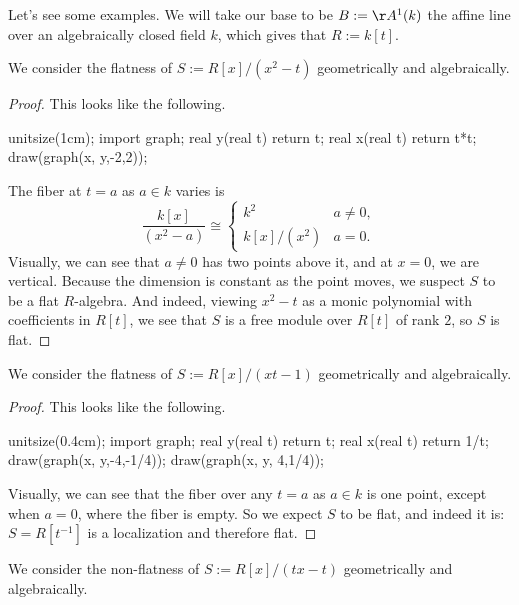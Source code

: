 Let's see some examples. We will take our base to be $B:=\AA^1(k)$ the affine line over an algebraically closed field $k$, which gives that $R:=k[t]$.
\begin{exe}
	We consider the flatness of $S:=R[x]/\left(x^2-t\right)$ geometrically and algebraically.
\end{exe}
\begin{proof}
	This looks like the following.
	\begin{center}
		\begin{asy}
			unitsize(1cm);
			import graph;
			real y(real t)
			{
				return t;
			}
			real x(real t)
			{
				return t*t;
			}
			draw(graph(x, y,-2,2));
		\end{asy}
	\end{center}
	The fiber at $t=a$ as $a\in k$ varies is
	\[\frac{k[x]}{\left(x^2-a\right)}\cong\begin{cases}
		k^2 & a\ne0, \\
		k[x]/\left(x^2\right) & a=0.
	\end{cases}\]
	Visually, we can see that $a\ne0$ has two points above it, and at $x=0$, we are vertical. Because the dimension is constant as the point moves, we suspect $S$ to be a flat $R$-algebra. And indeed, viewing $x^2-t$ as a monic polynomial with coefficients in $R[t]$, we see that $S$ is a free module over $R[t]$ of rank $2$, so $S$ is flat.
\end{proof}
\begin{exe}
	We consider the flatness of $S:=R[x]/\left(xt-1\right)$ geometrically and algebraically.
\end{exe}
\begin{proof}
	This looks like the following.
	\begin{center}
		\begin{asy}
			unitsize(0.4cm);
			import graph;
			real y(real t)
			{
				return t;
			}
			real x(real t)
			{
				return 1/t;
			}
			draw(graph(x, y,-4,-1/4));
			draw(graph(x, y, 4,1/4));
		\end{asy}
	\end{center}
	Visually, we can see that the fiber over any $t=a$ as $a\in k$ is one point, except when $a=0$, where the fiber is empty. So we expect $S$ to be flat, and indeed it is: $S=R\left[t^{-1}\right]$ is a localization and therefore flat.
\end{proof}
\begin{exe}
	We consider the non-flatness of $S:=R[x]/(tx-t)$ geometrically and algebraically.
\end{exe}
